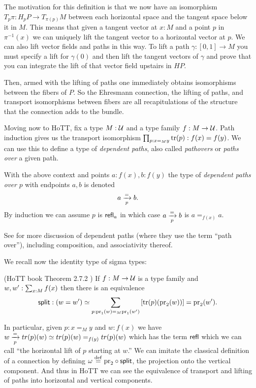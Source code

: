 The motivation for this definition is that we now have an isomorphism \( T_p\pi:H_pP\to T_{\pi(p)}M \) between each horizontal space and the tangent space below it in \( M \). This means that given a tangent vector at \( x:M \) and a point \( p \) in \( \pi^{-1}(x) \) we can uniquely lift the tangent vector to a horizontal vector at \( p \). We can also lift vector fields and paths in this way. To lift a path \( \gamma:[0,1]\to M \) you must specify a lift for \( \gamma(0) \) and then lift the tangent vectors of \( \gamma \) and prove that you can integrate the lift of that vector field upstairs in \( HP \).

Then, armed with the lifting of paths one immediately obtains isomorphisms between the fibers of \( P \). So the Ehresmann connection, the lifting of paths, and transport isomorphisms between fibers are all recapitulations of the structure that the connection adds to the bundle.

Moving now to HoTT, fix a type \( M:\mathcal{U} \) and a type family \( f:M\to\mathcal{U} \). Path induction gives us the transport isomorphism \( \prod_{p:x=_M y}\mathrm{tr}(p):f(x)=f(y) \). We can use this to define a type of \emph{dependent paths}, also called \emph{pathovers} or \emph{paths over} a given path.

\begin{mydef}
With the above context and points \( a:f(x), b:f(y) \) the type of \emph{dependent paths over \( p \)} with endpoints \( a, b \) is denoted
\[ a\xrightarrow[{p}]{=}b.
\]
By induction we can assume \( p \) is \( \mathsf{refl}_a \) in which case \( a\xrightarrow[{p}]{=}b \) is \( a=_{f(x)}a \).
\end{mydef}

See \cite{Symmetry} for more discussion of dependent paths (where they use the term ``path over''), including composition, and associativity thereof.

We recall now the identity type of sigma types:

\begin{mythm}\label{thm:idsit}
(HoTT book Theorem 2.7.2 \cite{hottbook}) If \( f:M\to \mathcal{U} \) is a type family and \( w,w':\sum_{x:M}f(x) \) then there is an equivalence 
\[ 
\mathsf{split}:(w=w')\simeq \sum_{p:\mathrm{pr}_1(w)=_M\mathrm{pr}_1(w')} \left[\mathrm{tr}(p)(\mathrm{pr}_2(w))\right] = \mathrm{pr}_2(w').
\]
\end{mythm}

In particular, given \( p:x=_M y \) and \( w:f(x) \) we have \( w\xrightarrow[{p}]{=}tr(p)(w)\simeq tr(p)(w)=_{f(y)}tr(p)(w) \) which has the term \( \mathsf{refl} \) which we can call ``the horizontal lift of \( p \) starting at \( w \).'' We can imitate the classical definition of a connection by defining \( \omega\stackrel{\mathrm{def}}{=} \mathrm{pr}_2\circ\mathsf{split} \), the projection onto the vertical component. And thus in HoTT we can see the equivalence of transport and lifting of paths into horizontal and vertical components.

